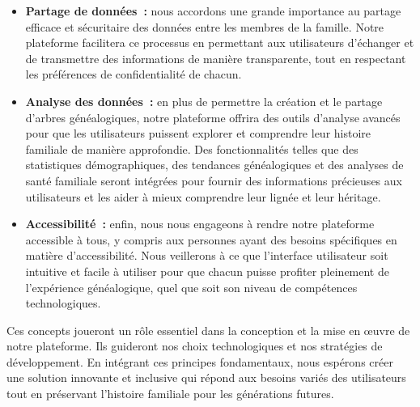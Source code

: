 \begin{itemize}
  \item \textbf{Partage de données :} nous accordons une grande importance au partage
    efficace et sécuritaire des données entre les membres de la famille. Notre
    plateforme facilitera ce processus en permettant aux utilisateurs d’échanger
    et de transmettre des informations de manière transparente, tout en respectant
    les préférences de confidentialité de chacun.

  \item \textbf{Analyse des données :} en plus de permettre la création et le partage
    d’arbres généalogiques, notre plateforme offrira des outils d’analyse avancés
    pour que les utilisateurs puissent explorer et comprendre leur histoire familiale
    de manière approfondie. Des fonctionnalités telles que des statistiques
    démographiques, des tendances généalogiques et des analyses de santé familiale
    seront intégrées pour fournir des informations précieuses aux utilisateurs et
    les aider à mieux comprendre leur lignée et leur héritage.

  \item \textbf{Accessibilité :} enfin, nous nous engageons à rendre notre plateforme
    accessible à tous, y compris aux personnes ayant des besoins spécifiques en
    matière d’accessibilité. Nous veillerons à ce que l’interface utilisateur soit
    intuitive et facile à utiliser pour que chacun puisse profiter pleinement de
    l’expérience généalogique, quel que soit son niveau de compétences technologiques.

\end{itemize}

Ces concepts joueront un rôle essentiel dans la conception et la mise en œuvre
de notre plateforme. Ils guideront nos choix technologiques et nos stratégies de
développement. En intégrant ces principes fondamentaux, nous espérons créer une
solution innovante et inclusive qui répond aux besoins variés des utilisateurs
tout en préservant l’histoire familiale pour les générations futures.
